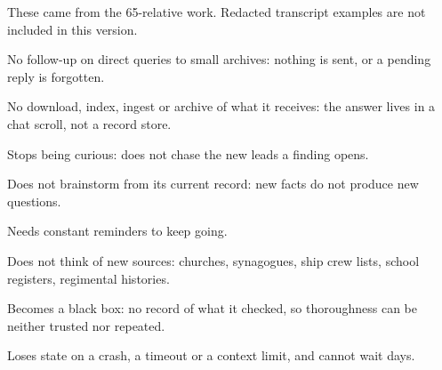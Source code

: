 These came from the 65-relative work. Redacted transcript examples are not included in this version.
\begin{description}[leftmargin=1.2em,labelindent=0pt,font=\normalfont\bfseries]
\item[F1] No follow-up on direct queries to small archives: nothing is sent, or a pending reply is forgotten.
\item[F2] No download, index, ingest or archive of what it receives: the answer lives in a chat scroll, not a record store.
\item[F3] Stops being curious: does not chase the new leads a finding opens.
\item[F4] Does not brainstorm from its current record: new facts do not produce new questions.
\item[F5] Needs constant reminders to keep going.
\item[F6] Does not think of new sources: churches, synagogues, ship crew lists, school registers, regimental histories.
\item[F7] Becomes a black box: no record of what it checked, so thoroughness can be neither trusted nor repeated.
\item[F8] Loses state on a crash, a timeout or a context limit, and cannot wait days.
\end{description}
